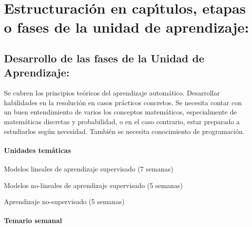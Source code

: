 \newpage

\section{Estructuraci\'{o}n en cap\'{\i}tulos, etapas o fases de la unidad de
  aprendizaje:}

\subsection{Desarrollo de las fases de la Unidad de Aprendizaje:}

\quad

Se cubren los principios te\'{o}ricos del aprendizaje
autom\'{a}tico. Desarrollar habilidades en la resoluci\'{o}n en casos
pr\'{a}cticos concretos. Se necesita contar con un buen entendimiento
de varios los conceptos matem\'{a}ticos, especialmente de
matem\'{a}ticas discretas y probabilidad, o en el caso contrario,
estar preparado a estudiarlos seg\'{u}n necesidad. Tambi\'{e}n se
necesita conocimiento de programaci\'{o}n.

\paragraph{Unidades tem\'{a}ticas}

\begin{description}[itemsep=-3pt]
\item[U1]{Modelos lineales de aprendizaje supervisado (7 semanas)}
\item[U2]{Modelos no-lineales de aprendizaje supervisado (5 semanas)}
\item[U3]{Aprendizaje no-supervisado (5 semanas)}  
\end{description}



\paragraph{Temario semanal}

